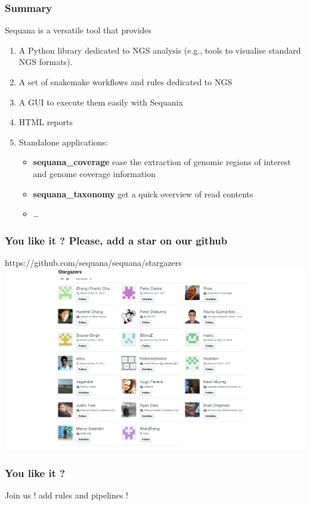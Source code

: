 \documentclass{beamer}
\begin{document}
\begin{frame}
 \frametitle{Summary}
Sequana is a versatile tool that provides

\begin{enumerate}
 \item A Python library dedicated to NGS analysis (e.g., tools to visualise 
standard NGS formats).
\item A set of snakemake workflows and rules dedicated to NGS 
 \item A GUI to execute them easily with Sequanix
 \item HTML reports
 \item Standalone applications:
 \begin{itemize}
    \item \textbf{sequana\_coverage} ease the extraction of genomic regions of interest and genome coverage information
    \item \textbf{sequana\_taxonomy} get a quick overview of read contents
    \item \dots
 \end{itemize}
\end{enumerate}
\end{frame}



\begin{frame}
\frametitle{You like it ? Please, add a star on our github}
    https://github.com/sequana/sequana/stargazers
    \centering
    \includegraphics[scale=0.28]{images/stargazers.png}\\
\end{frame}


\begin{frame}
\frametitle{You like it ? }
\centering
Join us ! add rules and pipelines !
\end{frame}
\end{document}
